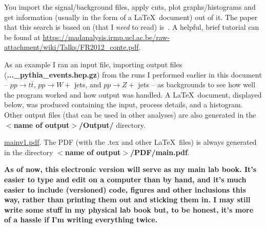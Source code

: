 You import the signal/background files, apply cuts, plot graphs/histograms and get information (usually in the form of a \LaTeX\ document) out of it. The paper that this search is based on (that I \emph{need} to read) is~\cite{ATLAS-CONF-2016-019}. A helpful, brief tutorial can be found at \url{https://madanalysis.irmp.ucl.ac.be/raw-attachment/wiki/Talks/FR2012_conte.pdf}.

As an example I ran an input file, importing \madgraph output files (\textbf{...\_pythia\_events.hep.gz}) from the runs I performed earlier in this document -- $pp \rightarrow t\bar{t}$, $pp \rightarrow W +$ jets, and $pp \rightarrow Z +$ jets -- as backgrounds to see how well the program worked and how output was handled. A \LaTeX\ document, displayed below, was produced containing the input, process details, and a histogram. Other output files (that can be used in other analyses) are also generated in the \textbf{$<$name of output$>$/Output/} directory.

\href{run:sec13/mainv1.pdf}{mainv1.pdf}. The PDF (with the .tex and other \LaTeX\ files) is always generated in the directory \textbf{$<$name of output$>$/PDF/main.pdf}.

\textbf{As of now, this electronic version will serve as my main lab book. It's easier to type and edit on a computer than by hand, and it's much easier to include (versioned) code, figures and other inclusions this way, rather than printing them out and sticking them in. I may still write some stuff in my physical lab book but, to be honest, it's more of a hassle if I'm writing everything twice.}
